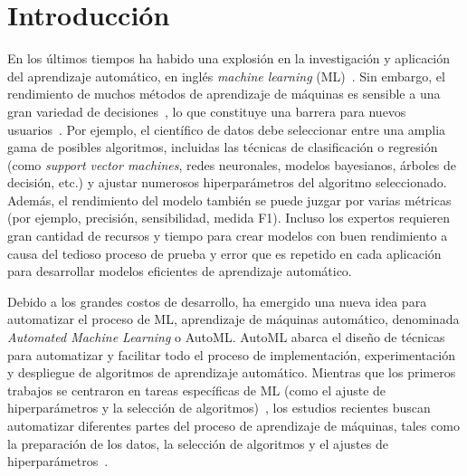 \chapter*{Introducción}\label{chapter:introduction}

\qquad 

En los últimos tiempos ha habido una explosión en la investigación y aplicación del aprendizaje automático, en inglés \textit{machine learning} (ML)~\cite{hey2020machinelearning}. Sin embargo, el rendimiento de muchos métodos de aprendizaje de máquinas es sensible a una gran variedad de decisiones~\cite{dyrmishi2019decision, radwa2019automated}, lo que constituye una barrera para nuevos usuarios~\cite{crisan2021fits}. Por ejemplo, el científico de datos debe seleccionar entre una amplia gama de posibles algoritmos, incluidas las técnicas de clasificación o regresión (como \textit{support vector machines}, redes neuronales, modelos bayesianos, árboles de decisión, etc.) y ajustar numerosos hiperparámetros del algoritmo seleccionado. Además, el rendimiento del modelo también se puede juzgar por varias métricas (por ejemplo, precisión, sensibilidad, medida F1). Incluso los expertos requieren gran cantidad de recursos y tiempo para crear modelos con buen rendimiento a causa del tedioso proceso de prueba y error que es repetido en cada aplicación para desarrollar modelos eficientes de aprendizaje automático.

Debido a los grandes costos de desarrollo, ha emergido una nueva idea para automatizar el proceso de ML, aprendizaje de máquinas automático, denominada \textit{Automated Machine Learning} o AutoML. AutoML abarca el diseño de técnicas para automatizar y facilitar todo el proceso de implementación, experimentación y despliegue de algoritmos de aprendizaje automático. Mientras que los primeros trabajos se centraron en tareas específicas de ML (como el ajuste de hiperparámetros y la selección de algoritmos)~\cite{thornton2013auto}, los estudios recientes buscan automatizar diferentes partes del proceso de aprendizaje de máquinas, tales como la preparación de los datos, la selección de algoritmos y el ajustes de hiperparámetros~\cite{fuerer2015efficient, olson2019tpot, paszke2019pytorch, chen2018autostacker, swearingen2017atm}.

